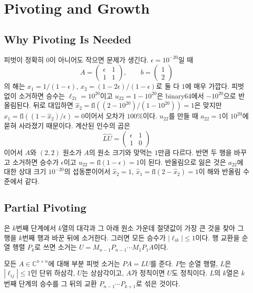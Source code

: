 \section{Pivoting and Growth}
\label{sec:lu-pivoting}

\subsection{Why Pivoting Is Needed}

피벗이 정확히 $0$이 아니어도 작으면 문제가 생긴다. $\epsilon=10^{-20}$일 때
\[
A=\begin{pmatrix}\epsilon&1\\1&1\end{pmatrix},\qquad b=\begin{pmatrix}1\\2\end{pmatrix}
\]
의 해는 $x_1=1/(1-\epsilon)$, $x_2=(1-2\epsilon)/(1-\epsilon)$로 둘 다 $1$에 매우 가깝다. 피벗 없이 소거하면 승수는 $\ell_{21}=10^{20}$이고 $u_{22}=1-10^{20}$은 binary64에서 $-10^{20}$으로 반올림된다. 뒤로 대입하면 $\hat x_2=\mathrm{fl}((2-10^{20})/(1-10^{20}))=1$은 맞지만 $\hat x_1=\mathrm{fl}((1-\hat x_2)/\epsilon)=0$이어서 오차가 $100\%$이다. $u_{22}$를 만들 때 $a_{22}=1$이 $10^{20}$에 묻혀 사라졌기 때문이다. 계산된 인수의 곱은
\[
\hat L\hat U=\begin{pmatrix}\epsilon&1\\1&0\end{pmatrix}
\]
이어서 $A$와 $(2,2)$ 원소가 $A$의 원소 크기와 맞먹는 $1$만큼 다르다. 반면 두 행을 바꾸고 소거하면 승수가 $\epsilon$이고 $u_{22}=\mathrm{fl}(1-\epsilon)=1$이 된다. 반올림으로 잃은 것은 $a_{22}$에 대한 상대 크기 $10^{-20}$의 섭동뿐이어서 $\hat x_2=1$, $\hat x_1=\mathrm{fl}(2-\hat x_2)=1$이 해와 반올림 수준에서 같다.

\subsection{Partial Pivoting}

은 $k$번째 단계에서 $k$열의 대각과 그 아래 원소 가운데 절댓값이 가장 큰 것을 찾아 그 행을 $k$번째 행과 바꾼 뒤에 소거한다. 그러면 모든 승수가 $|\ell_{ik}|\le1$이다. 행 교환을 순열 행렬 $P_k$로 쓰면 소거는 $U=M_{n-1}P_{n-1}\cdots M_1P_1A$이다.

\begin{theorem}
\label{thm:lu-partial-pivoting}
모든 $A\in\mathbb C^{n\times n}$에 대해 부분 피벗 소거는 $PA=LU$를 준다. $P$는 순열 행렬, $L$은 $|\ell_{ij}|\le1$인 단위 하삼각, $U$는 상삼각이고, $A$가 정칙이면 $U$도 정칙이다. $L$의 $k$열은 $k$번째 단계의 승수를 그 뒤의 교환 $P_{n-1}\cdots P_{k+1}$로 섞은 것이다.
\end{theorem}

